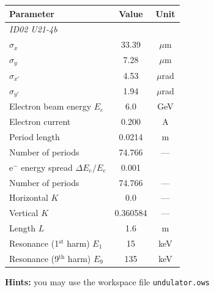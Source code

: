 \begin{questionsbox}
\begin{center}
\label{tab:electron_params_ID02}
\begin{tabular}{lcc}
\hline
\textbf{Parameter} & \textbf{Value} & \textbf{Unit} \\
\hline
\multicolumn{3}{l}{\textit{ID02 U21-4b}} \\
\hline
$\sigma_x$ & 33.39 & $\mu$m \\
$\sigma_y$ & 7.28 & $\mu$m \\
$\sigma_{x'}$ & 4.53 & $\mu$rad \\
$\sigma_{y'}$ & 1.94 & $\mu$rad \\
Electron beam energy $E_e$ & 6.0 & GeV \\
Electron current & 0.200 & A \\
\hline
Period length & 0.0214 & m \\
Number of periods & 74.766 & ---\\
e$^-$ energy spread $\Delta E_e/E_e$ & 0.001 &  \\
Number of periods & 74.766 & ---\\
Horizontal $K$ & 0.0 & --- \\
Vertical $K$ & 0.360584 & --- \\
Length $L$ & 1.6 & m \\
Resonance (1$^\text{st}$ harm) $E_1$ & 15 & keV \\
Resonance (9$^\text{th}$ harm) $E_9$ & 135 & keV \\
\hline
\end{tabular}
\end{center}
\end{questionsbox}

\begin{hintsbox}
\textbf{Hints:} you may use the workspace file {\tt undulator.ows}
\end{hintsbox}

